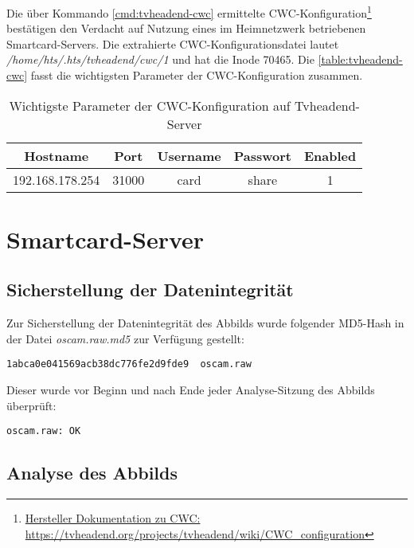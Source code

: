 Die über Kommando \autoref{cmd:tvheadend-cwc} ermittelte CWC-Konfiguration\footnote{\href{https://tvheadend.org/projects/tvheadend/wiki/CWC\_configuration}{Hersteller Dokumentation zu CWC: https://tvheadend.org/projects/tvheadend/wiki/CWC\_configuration}} bestätigen den Verdacht auf Nutzung eines im Heimnetzwerk betriebenen Smartcard-Servers. Die extrahierte CWC-Konfigurationsdatei lautet \textit{/home/hts/.hts/tvheadend/cwc/1} und hat die Inode 70465. Die \autoref{table:tvheadend-cwc} fasst die wichtigsten Parameter der CWC-Konfiguration zusammen.

\begin{table}[H]
\centering
\begin{tabular}{ccccc}
\hline 
Hostname & Port & Username & Passwort & Enabled \\ 
\hline 
192.168.178.254 & 31000 & card & share & 1 \\ 
\hline 
\end{tabular}
\caption{Wichtigste Parameter der CWC-Konfiguration auf Tvheadend-Server}
\label{table:tvheadend-cwc}
\end{table}

\section{Smartcard-Server}

\subsection{Sicherstellung der Datenintegrität}

Zur Sicherstellung der Datenintegrität des Abbilds wurde folgender MD5-Hash in der Datei \textit{oscam.raw.md5} zur Verfügung gestellt:

\begin{verbatim}
1abca0e041569acb38dc776fe2d9fde9  oscam.raw
\end{verbatim}

Dieser wurde vor Beginn und nach Ende jeder Analyse-Sitzung des Abbilds überprüft:

\begin{cmd}
\begin{verbatim}
oscam.raw: OK
\end{verbatim}
\caption{md5sum -c oscam.raw.md5}
\end{cmd}

\subsection{Analyse des Abbilds}


